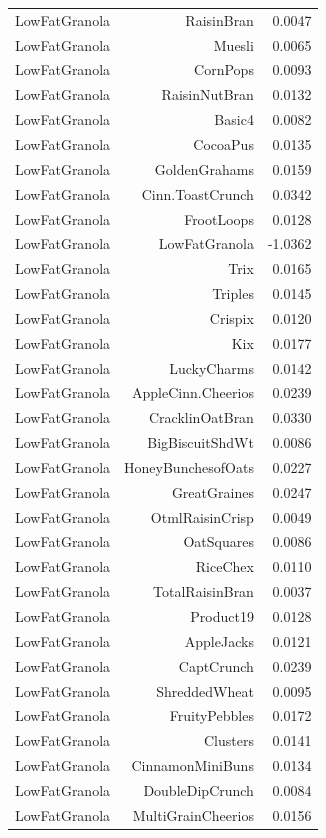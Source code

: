 \begin{longtable}{@{}lrr@{}}
LowFatGranola & RaisinBran & 0.0047 \\
LowFatGranola & Muesli & 0.0065 \\
LowFatGranola & CornPops & 0.0093 \\
LowFatGranola & RaisinNutBran & 0.0132 \\
LowFatGranola & Basic4 & 0.0082 \\
LowFatGranola & CocoaPus & 0.0135 \\
LowFatGranola & GoldenGrahams & 0.0159 \\
LowFatGranola & Cinn.ToastCrunch & 0.0342 \\
LowFatGranola & FrootLoops & 0.0128 \\
LowFatGranola & LowFatGranola & -1.0362 \\
LowFatGranola & Trix & 0.0165 \\
LowFatGranola & Triples & 0.0145 \\
LowFatGranola & Crispix & 0.0120 \\
LowFatGranola & Kix & 0.0177 \\
LowFatGranola & LuckyCharms & 0.0142 \\
LowFatGranola & AppleCinn.Cheerios & 0.0239 \\
LowFatGranola & CracklinOatBran & 0.0330 \\
LowFatGranola & BigBiscuitShdWt & 0.0086 \\
LowFatGranola & HoneyBunchesofOats & 0.0227 \\
LowFatGranola & GreatGraines & 0.0247 \\
LowFatGranola & OtmlRaisinCrisp & 0.0049 \\
LowFatGranola & OatSquares & 0.0086 \\
LowFatGranola & RiceChex & 0.0110 \\
LowFatGranola & TotalRaisinBran & 0.0037 \\
LowFatGranola & Product19 & 0.0128 \\
LowFatGranola & AppleJacks & 0.0121 \\
LowFatGranola & CaptCrunch & 0.0239 \\
LowFatGranola & ShreddedWheat & 0.0095 \\
LowFatGranola & FruityPebbles & 0.0172 \\
LowFatGranola & Clusters & 0.0141 \\
LowFatGranola & CinnamonMiniBuns & 0.0134 \\
LowFatGranola & DoubleDipCrunch & 0.0084 \\
LowFatGranola & MultiGrainCheerios & 0.0156 \\

\end{longtable}
